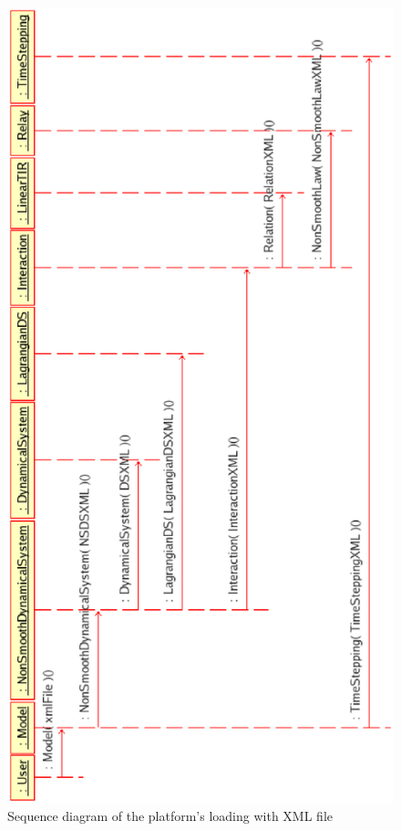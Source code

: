 \begin{figure}
\begin{center}
        \includegraphics[scale=0.85, clip]{figure/platform_loading_XML.ps}
        \caption{Sequence diagram of the platform's loading with XML file}
        \label{fig: platform's loading1}
\end{center}
\end{figure}

